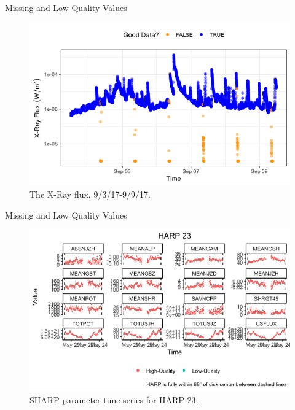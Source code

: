 \documentclass{beamer}
\begin{document}
\begin{frame}{Missing and Low Quality Values}
    \begin{figure}
        \centering
        \includegraphics[scale=0.5]{flux_20170906.png}
        \caption{The X-Ray flux, 9/3/17-9/9/17.}
        \label{fig:flux_20170906}
    \end{figure}
\end{frame}

\begin{frame}{Missing and Low Quality Values}
    \begin{figure}[!htb]
        \centering
        \includegraphics[scale=0.5]{harp23.png}
        \caption{SHARP parameter time series for HARP 23.}
        \label{fig:na_props_flux}
    \end{figure}
\end{frame}
\end{document}
